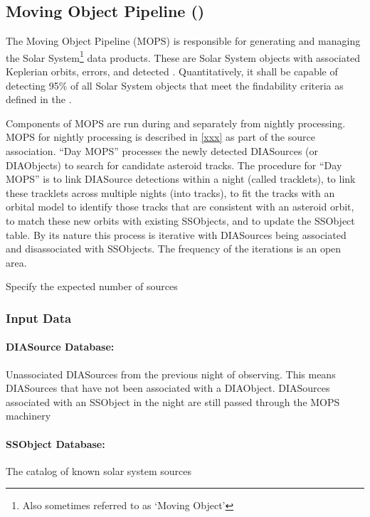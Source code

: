 \subsection{Moving Object Pipeline (\wbsMOPS)}

The Moving Object Pipeline (MOPS) is responsible for generating and managing the Solar System\footnote{Also sometimes referred to as `Moving Object'} data products. These are Solar System objects with associated Keplerian orbits, errors, and detected \DIASources. Quantitatively, it shall be capable of detecting 95\% of all Solar System objects that meet the findability criteria as defined in the \OSS\@. 


Components of MOPS are run during and separately from nightly processing. MOPS for nightly processing is described in \ref{xxx} as part of the source association. ``Day MOPS'' processes the newly detected DIASources (or DIAObjects) to search for candidate asteroid tracks. The procedure for ``Day MOPS'' is to link DIASource detections within a night (called tracklets), to link these tracklets across multiple nights (into tracks), to fit the tracks with an orbital model to identify those tracks that are consistent with an asteroid orbit, to match these new orbits with existing SSObjects, and to update the SSObject table. By its nature this process is iterative with DIASources being associated and disassociated with SSObjects. The frequency of the iterations is an open area.

\begin{note} Specify the expected number of sources \end{note}

\subsubsection{Input Data}

\paragraph*{DIASource Database: } Unassociated DIASources from the previous night of observing.  This means DIASources that have not been associated with a DIAObject.  DIASources associated with an SSObject in the night are still passed through the MOPS machinery

\paragraph*{SSObject Database: } The catalog of known solar system sources

